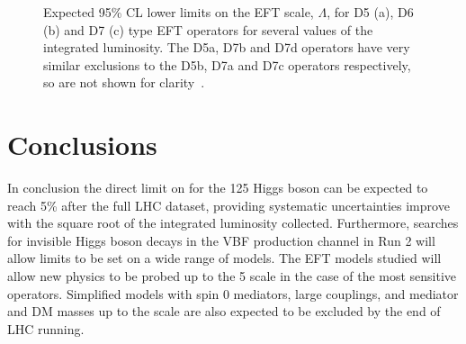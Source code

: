 \begin{figure}
  \caption[Expected 95\% CL lower limits on the EFT scale, $\Lambda$, for D5 (a), D6 (b) and D7 (c) type EFT operators for several values of the integrated luminosity. The D5a, D7b and D7d operators have very similar exclusions to the D5b, D7a and D7c operators respectively, so are not shown for clarity.]{Expected 95\% CL lower limits on the EFT scale, $\Lambda$, for D5 (a), D6 (b) and D7 (c) type EFT operators for several values of the integrated luminosity. The D5a, D7b and D7d operators have very similar exclusions to the D5b, D7a and D7c operators respectively, so are not shown for clarity~\cite{ourdmpaper}.}
  \label{fig:eftlimits}
\end{figure}

\section{Conclusions}
\label{sec:dmconclusions}
In conclusion the direct limit on \BRinv for the 125 \GeV Higgs boson can be expected to reach 5\% after the full LHC dataset, providing systematic uncertainties improve with the square root of the integrated luminosity collected. Furthermore, searches for invisible Higgs boson decays in the \ac{VBF} production channel in Run 2 will allow limits to be set on a wide range of models. The \ac{EFT} models studied will allow new physics to be probed up to the 5 \TeV scale in the case of the most sensitive operators. Simplified models with spin 0 mediators, large couplings, and mediator and \ac{DM} masses  up to the \TeV scale are also expected to be excluded by the end of LHC running.

